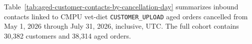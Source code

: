 Table~\ref{tab:aged-customer-contacts-by-cancellation-day} summarizes inbound
contacts linked to CMPU vet-diet \texttt{CUSTOMER\_UPLOAD} aged orders cancelled
from May 1, 2026 through July 31, 2026, inclusive, UTC.
The full cohort contains 30,382 customers and 38,314 aged orders.



\clearpage
